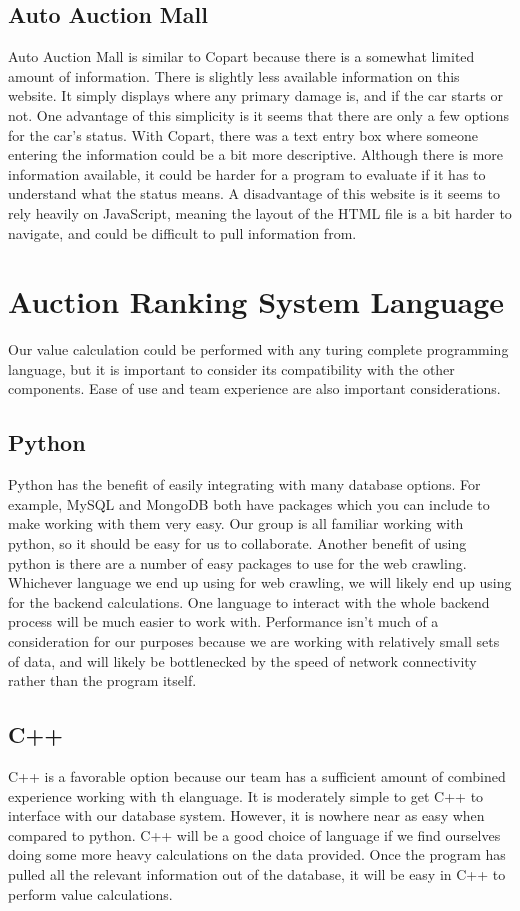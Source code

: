 \documentclass[draftclsnofoot,onecolumn,10pt]{IEEEtran}
\begin{document}
\subsection{Auto Auction Mall}
Auto Auction Mall is similar to Copart because there is a somewhat limited amount of information. There is slightly less available information on this website. It simply displays where any primary damage is, and if the car starts or not. One advantage of this simplicity is it seems that there are only a few options for the car's status. With Copart, there was a text entry box where someone entering the information could be a bit more descriptive. Although there is more information available, it could be harder for a program to evaluate if it has to understand what the status means. A disadvantage of this website is it seems to rely heavily on JavaScript, meaning the layout of the HTML file is a bit harder to navigate, and could be difficult to pull information from. \cite{aam}

\section{Auction Ranking System Language}
Our value calculation could be performed with any turing complete programming language, but it is important to consider its compatibility with the other components. Ease of use and team experience are also important considerations. 

\subsection{Python}
Python has the benefit of easily integrating with many database options. For example, MySQL and MongoDB both have packages which you can include to make working with them very easy. Our group is all familiar working with python, so it should be easy for us to collaborate. Another benefit of using python is there are a number of easy packages to use for the web crawling. Whichever language we end up using for web crawling, we will likely end up using for the backend calculations. One language to interact with the whole backend process will be much easier to work with. Performance isn't much of a consideration for our purposes because we are working with relatively small sets of data, and will likely be bottlenecked by the speed of network connectivity rather than the program itself. 

\subsection{C++}
C++ is a favorable option because our team has a sufficient amount of combined experience working with th elanguage. It is moderately simple to get C++ to interface with our database system. However, it is nowhere near as easy when compared to python. C++ will be a good choice of language if we find ourselves doing some more heavy calculations on the data provided. Once the program has pulled all the relevant information out of the database, it will be easy in C++ to perform value calculations.  
\end{document}
